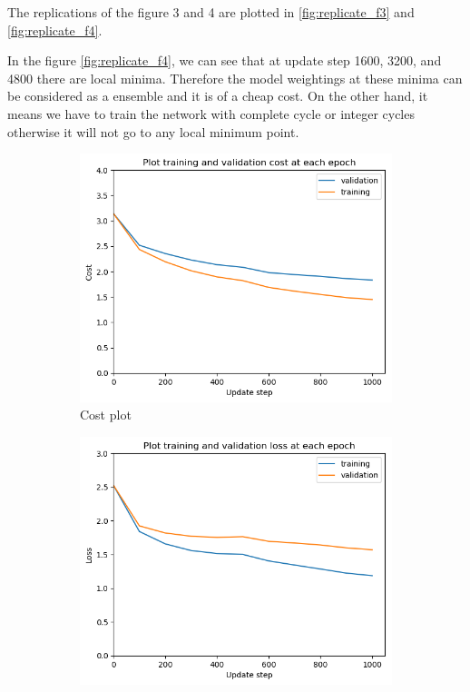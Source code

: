 \documentclass[12pt]{article}
\newenvironment{question}[2][Question]{\begin{trivlist}
\kern10pt
\item[\hskip \labelsep {\bfseries #1}\hskip \labelsep {\bfseries #2.}]}{\end{trivlist}}
\begin{document}
\begin{question}{2.ii}

The replications of the figure 3 and 4 are plotted in \ref{fig:replicate_f3} and
\ref{fig:replicate_f4}.

In the figure \ref{fig:replicate_f4}, we can see that at update step 1600, 3200,
and 4800 there are local minima. Therefore the model weightings at these minima
can be considered as a ensemble and it is of a cheap cost. On the other hand, it means we have to
train the network with complete cycle or integer cycles otherwise it will not go to any local
minimum point.

\begin{figure}[!htb]
    \begin{subfigure}[b]{0.32\textwidth}
        \includegraphics[width=\linewidth]{f3_cost_plt.png}
        \caption{Cost plot}
    \end{subfigure}
    \hfill
    \begin{subfigure}[b]{0.32\textwidth}
        \includegraphics[width=\linewidth]{f3_loss_plt.png}

\end{subfigure}
\end{figure}
\end{question}
\end{document}
